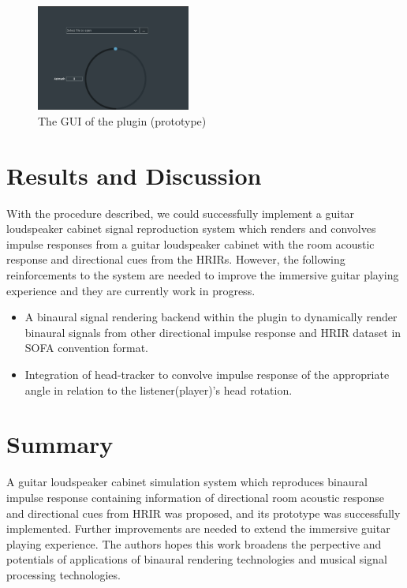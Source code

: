 \documentclass[convention,e-brief]{aesconf-current}
\begin{document}
\begin{figure}
    \centering
    \includegraphics[width=0.45\textwidth]{./fig/gui.png}
    \caption{The GUI of the plugin (prototype)}
    \label{fig:gui}
\end{figure}

\section{Results and Discussion}
With the procedure described, we could successfully implement a guitar loudspeaker cabinet signal reproduction system which renders and convolves impulse responses from a guitar loudspeaker cabinet with the room acoustic response and directional cues from the HRIRs.
However, the following reinforcements to the system are needed to improve the immersive guitar playing experience and they are currently work in progress.

\begin{itemize}
    \item A binaural signal rendering backend within the plugin to dynamically render binaural signals from other directional impulse response and HRIR dataset in SOFA convention format.
    \item Integration of head-tracker to convolve impulse response of the appropriate angle in relation to the listener(player)'s head rotation.
\end{itemize}

\section{Summary}

A guitar loudspeaker cabinet simulation system which reproduces binaural impulse response containing information of directional room acoustic response and directional cues from HRIR was proposed, and its prototype was successfully implemented.
Further improvements are needed to extend the immersive guitar playing experience.
The authors hopes this work broadens the perpective and potentials of applications of binaural rendering technologies and musical signal processing technologies.






\end{document}
